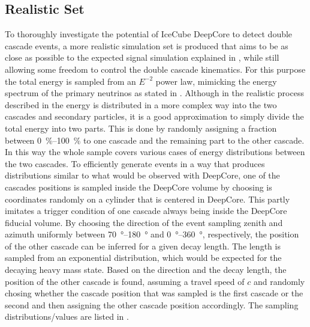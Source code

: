 \subsection{Realistic Set}

To thoroughly investigate the potential of IceCube DeepCore to detect double cascade events, a more realistic simulation set is produced that aims to be as close as possible to the expected signal simulation explained in , while still allowing some freedom to control the double cascade kinematics. For this purpose the total energy is sampled from an $E^{-2}$ power law, mimicking the energy spectrum of the primary neutrinos as stated in . Although in the realistic process described in  the energy is distributed in a more complex way into the two cascades and secondary particles, it is a good approximation to simply divide the total energy into two parts. This is done by randomly assigning a fraction between \SIrange[range-phrase={~and~}]{0}{100}{\percent} to one cascade and the remaining part to the other cascade. In this way the whole sample covers various cases of energy distributions between the two cascades. To efficiently generate events in a way that produces distributions similar to what would be observed with DeepCore, one of the cascades positions is sampled inside the DeepCore volume by choosing is coordinates randomly on a cylinder that is centered in DeepCore. This partly imitates a trigger condition of one cascade always being inside the DeepCore fiducial volume. By choosing the direction of the event sampling zenith and azimuth uniformly between \SIrange[range-phrase={~and~}]{70}{180}{\degree} and \SIrange[range-phrase={~and~}]{0}{360}{\degree}, respectively, the position of the other cascade can be inferred for a given decay length. The length is sampled from an exponential distribution, which would be expected for the decaying heavy mass state. Based on the direction and the decay length, the position of the other cascade is found, assuming a travel speed of $c$ and randomly chosing whether the cascade position that was sampled is the first cascade or the second and then assigning the other cascade position accordingly. The sampling distributions/values are listed in .

